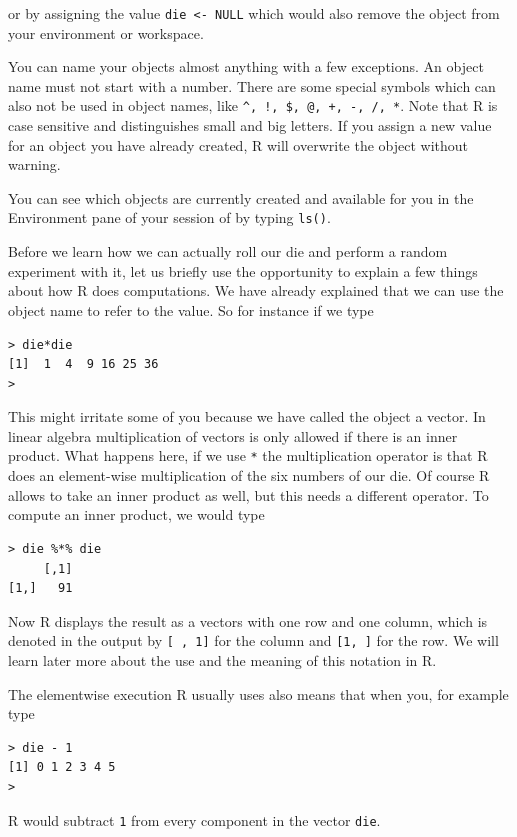 \documentclass[
]{book}
\begin{document}
or by assigning the value \texttt{die\ \textless{}-\ NULL} which would also remove the object from your
environment or workspace.

You can name your objects almost anything with a few exceptions. An object name must not start with
a number. There are some special symbols which can also not be used in object names, like
\texttt{\^{},\ !,\ \$,\ @,\ +,\ -,\ /,\ *}. Note that R is case sensitive and distinguishes small and big
letters. If you assign a new value for an object you have already created, R will overwrite the
object without warning.

You can see which objects are currently created and available for you in the Environment pane
of your session of by typing \texttt{ls()}.

Before we learn how we can actually roll our die and perform a random experiment with it, let us
briefly use the opportunity to explain a few things about how R does computations. We have
already explained that we can use the object name to refer to the value. So for instance
if we type

\begin{verbatim}
> die*die
[1]  1  4  9 16 25 36
> 
\end{verbatim}

This might irritate some of you because we have called the object a vector. In linear
algebra multiplication of vectors is only allowed if there is an inner product. What happens
here, if we use \texttt{*} the multiplication operator is that R does an element-wise multiplication
of the six numbers of our die. Of course R allows to take an inner product as well, but this needs
a different operator. To compute an inner product, we would type

\begin{verbatim}
> die %*% die
     [,1]
[1,]   91
\end{verbatim}

Now R displays the result as a vectors with one row and one column, which is denoted in the output by
\texttt{{[}\ ,\ 1{]}} for the column and \texttt{{[}1,\ {]}} for the row. We will learn later more about
the use and the meaning of this notation in R.

The elementwise execution R usually uses also means that when you, for example type

\begin{verbatim}
> die - 1
[1] 0 1 2 3 4 5
> 
\end{verbatim}

R would subtract \texttt{1} from every component in the vector \texttt{die}.
\end{document}
